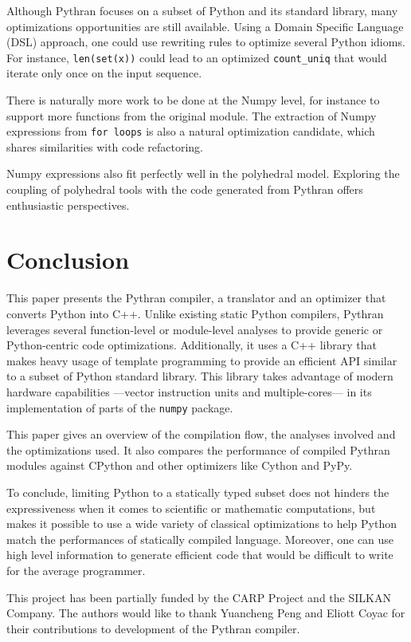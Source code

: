 \documentclass[10pt, onecolumn, preprint]{sigplanconf}
\begin{document}
Although Pythran focuses on a subset of Python and its standard library, many
optimizations opportunities are still available. Using a Domain Specific
Language (DSL) approach, one could use rewriting rules to optimize several
Python idioms. For instance, \texttt{len(set(x))} could lead to an optimized
\texttt{count\_uniq} that would iterate only once on the input sequence.

There is naturally more work to be done at the Numpy level, for instance to
support more functions from the original module. The extraction of Numpy
expressions from \texttt{for loops} is also a natural optimization candidate, which
shares similarities with code refactoring.

Numpy expressions also fit perfectly well in the polyhedral model. Exploring
the coupling of polyhedral tools with the code generated from Pythran offers
enthusiastic perspectives.

\section{Conclusion}

This paper presents the Pythran compiler, a translator and an optimizer that
converts Python into C++. Unlike existing static Python compilers, Pythran
leverages several function-level or module-level analyses to provide
generic or Python-centric code optimizations. Additionally, it uses a C++
library that makes heavy usage of template programming to provide an efficient
API similar to a subset of Python standard library. This library takes
advantage of modern hardware capabilities ---vector instruction units and
multiple-cores--- in its implementation of parts of the \texttt{numpy} package.

This paper gives an overview of the compilation flow, the analyses involved and
the optimizations used. It also compares the performance of compiled Pythran
modules against CPython and other optimizers like Cython and PyPy.

To conclude, limiting Python to a statically typed subset does not hinders the
expressiveness when it comes to scientific or mathematic computations, but makes
it possible to use a wide variety of classical optimizations to help Python
match the performances of statically compiled language. Moreover, one can use
high level information to generate efficient code that would be difficult to
write for the average programmer.



\acks


This project has been partially funded by the CARP Project and the SILKAN
Company.  The authors would like to thank Yuancheng Peng and Eliott Coyac for
their contributions to development of the Pythran compiler.




\end{document}
